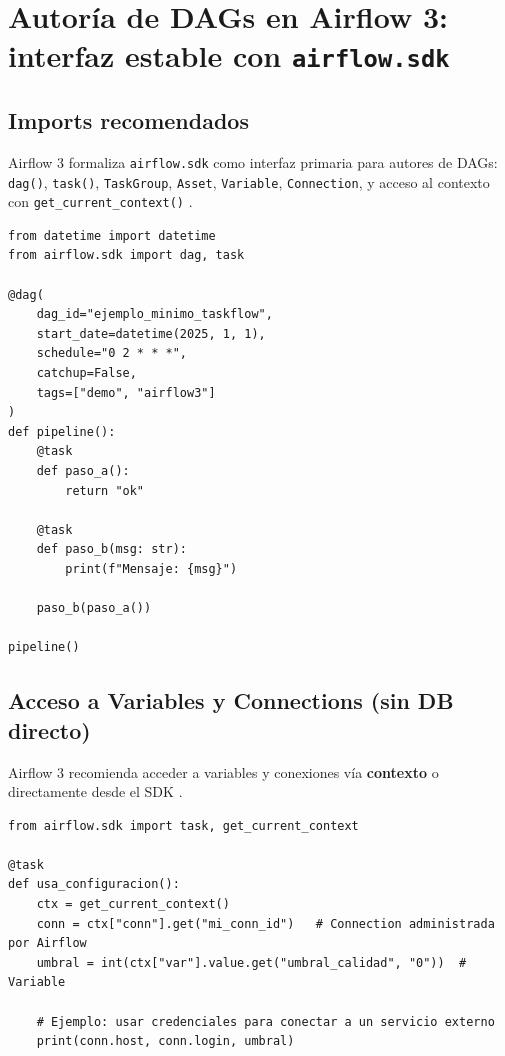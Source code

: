 \section{Autoría de DAGs en Airflow 3: interfaz estable con \texttt{airflow.sdk}}
\subsection{Imports recomendados}
Airflow 3 formaliza \texttt{airflow.sdk} como interfaz primaria para autores de DAGs: \texttt{dag()}, \texttt{task()}, \texttt{TaskGroup}, \texttt{Asset}, \texttt{Variable}, \texttt{Connection}, y acceso al contexto con \texttt{get\_current\_context()} \cite{airflow_public_interface}.

\begin{lstlisting}[style=python,caption={Estructura mínima de un DAG con TaskFlow API (Airflow 3.x)}]
from datetime import datetime
from airflow.sdk import dag, task

@dag(
    dag_id="ejemplo_minimo_taskflow",
    start_date=datetime(2025, 1, 1),
    schedule="0 2 * * *",
    catchup=False,
    tags=["demo", "airflow3"]
)
def pipeline():
    @task
    def paso_a():
        return "ok"

    @task
    def paso_b(msg: str):
        print(f"Mensaje: {msg}")

    paso_b(paso_a())

pipeline()
\end{lstlisting}

\subsection{Acceso a Variables y Connections (sin DB directo)}
Airflow 3 recomienda acceder a variables y conexiones vía \textbf{contexto} o directamente desde el SDK \cite{airflow_public_interface}.

\begin{lstlisting}[style=python,caption={Acceso a Variable/Connection usando el contexto de tarea (recomendado)}]
from airflow.sdk import task, get_current_context

@task
def usa_configuracion():
    ctx = get_current_context()
    conn = ctx["conn"].get("mi_conn_id")   # Connection administrada por Airflow
    umbral = int(ctx["var"].value.get("umbral_calidad", "0"))  # Variable

    # Ejemplo: usar credenciales para conectar a un servicio externo
    print(conn.host, conn.login, umbral)
\end{lstlisting}

